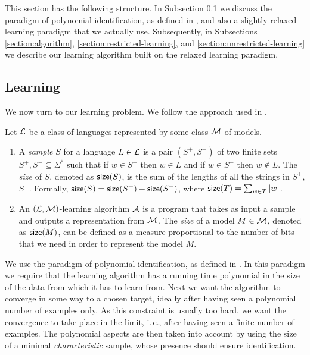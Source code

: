 This section has the following structure. In Subsection \ref{section:learning} we discuss the paradigm of polynomial identification, as defined in \cite{Gold78, delaHiguera1997}, and also a slightly relaxed learning paradigm that we actually use. Subsequently, in Subsections \ref{section:algorithm}, \ref{section:restricted-learning}, and \ref{section:unrestricted-learning} we describe our learning algorithm built on the relaxed learning paradigm.

\subsection{Learning}\label{section:learning}

We now turn to our learning problem. We follow the approach used in \cite{Eyraud2007}.

\begin{definition}\label{definition:identification1}
Let $\textup{\sf $\mathcal{L}$}$ be a class of languages represented by some class $\textup{\sf $\mathcal{M}$}$ of models.
\begin{enumerate}
\item A \emph{sample} $S$ for a language $L \in \textup{\sf $\mathcal{L}$}$ is a pair $(S^+, S^-)$ of two finite sets $S^+, S^- \subseteq \Sigma^*$ such that if $w \in S^+$ then $w \in L$ and if $w \in S^-$ then $w \notin L$. The \emph{size} of $S$, denoted as $\textup{\sf size}(S)$, is the sum of the lengths of all the strings in $S^+$, $S^-$. Formally, $\textup{\sf size}(S) = \textup{\sf size}(S^+) + \textup{\sf size}(S^-)$, where $\textup{\sf size}(T) = \sum_{w \in T} |w|$.

\item An $(\textup{\sf $\mathcal{L}$}, \textup{\sf $\mathcal{M}$})$-learning algorithm $\textup{\sf $\mathcal{A}$}$ is a program that takes as input a sample and outputs a representation from $\textup{\sf $\mathcal{M}$}$. The \emph{size} of a model $M \in \textup{\sf $\mathcal{M}$}$, denoted as $\textup{\sf size}(M)$, can be defined as a measure proportional to the number of bits that we need in order to represent the model $M$.
\end{enumerate}
\end{definition}

We use the paradigm of polynomial identification, as defined in \cite{Gold78, delaHiguera1997}. In this paradigm we require that the learning algorithm has a running time polynomial in the size of the data from which it has to learn from. Next we want the algorithm to converge in some way to a chosen target, ideally after having seen a polynomial number of examples only. As this constraint is usually too hard, we want the convergence to take place in the limit, i.\,e., after having seen a finite number of examples. The polynomial aspects are then taken into account by using the size of a minimal \emph{characteristic} sample, whose presence should ensure identification.

